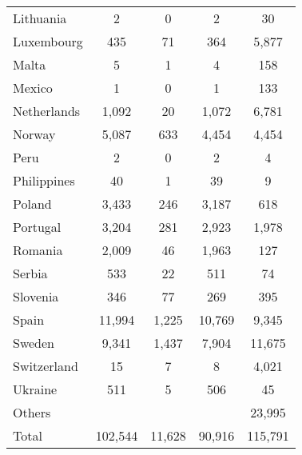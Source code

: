 \begin{longtable}{lcccc}
Lithuania   & 2            & 0            & 2                    & 30                  \\
Luxembourg  & 435          & 71           & 364                  & 5,877                \\
Malta       & 5            & 1            & 4                    & 158                 \\
Mexico      & 1            & 0            & 1                    & 133                 \\
Netherlands & 1,092         & 20           & 1,072                 & 6,781                \\
Norway      & 5,087         & 633          & 4,454                 & 4,454                \\
Peru        & 2            & 0            & 2                    & 4                   \\
Philippines & 40           & 1            & 39                   & 9                   \\
Poland      & 3,433         & 246          & 3,187                 & 618                 \\
Portugal    & 3,204         & 281          & 2,923                 & 1,978                \\
Romania     & 2,009         & 46           & 1,963                 & 127                 \\
Serbia      & 533          & 22           & 511                  & 74                  \\
Slovenia    & 346          & 77           & 269                  & 395                 \\
Spain       & 11,994        & 1,225         & 10,769                & 9,345                \\
Sweden      & 9,341         & 1,437         & 7,904                 & 11,675               \\
Switzerland & 15           & 7            & 8                    & 4,021                \\
Ukraine     & 511          & 5            & 506                  & 45                  \\
Others      &              &              &                      & 23,995            \\ \hline
Total       & 102,544       & 11,628        & 90,916                & 115,791\\
\hline
\end{longtable}
